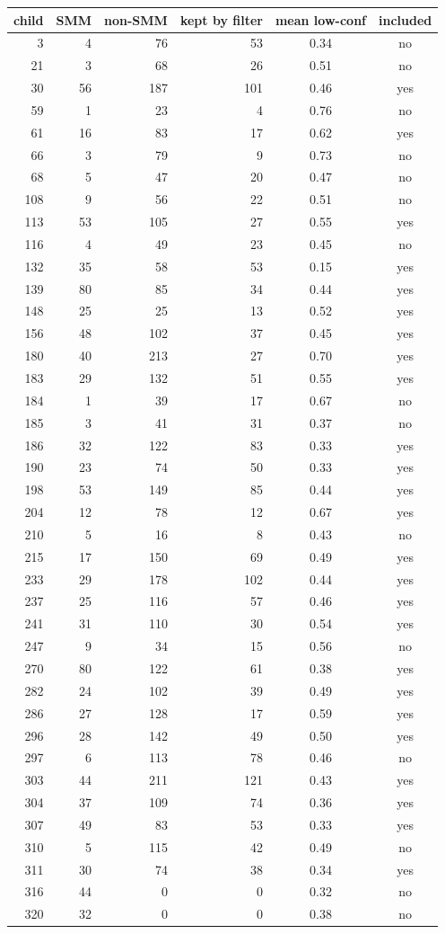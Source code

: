 \begin{tabular}{rrrrcc}
\toprule
child & SMM & non-SMM & kept by filter & mean low-conf & included \\
\midrule
3 & 4 & 76 & 53 & 0.34 & no \\
21 & 3 & 68 & 26 & 0.51 & no \\
30 & 56 & 187 & 101 & 0.46 & yes \\
59 & 1 & 23 & 4 & 0.76 & no \\
61 & 16 & 83 & 17 & 0.62 & yes \\
66 & 3 & 79 & 9 & 0.73 & no \\
68 & 5 & 47 & 20 & 0.47 & no \\
108 & 9 & 56 & 22 & 0.51 & no \\
113 & 53 & 105 & 27 & 0.55 & yes \\
116 & 4 & 49 & 23 & 0.45 & no \\
132 & 35 & 58 & 53 & 0.15 & yes \\
139 & 80 & 85 & 34 & 0.44 & yes \\
148 & 25 & 25 & 13 & 0.52 & yes \\
156 & 48 & 102 & 37 & 0.45 & yes \\
180 & 40 & 213 & 27 & 0.70 & yes \\
183 & 29 & 132 & 51 & 0.55 & yes \\
184 & 1 & 39 & 17 & 0.67 & no \\
185 & 3 & 41 & 31 & 0.37 & no \\
186 & 32 & 122 & 83 & 0.33 & yes \\
190 & 23 & 74 & 50 & 0.33 & yes \\
198 & 53 & 149 & 85 & 0.44 & yes \\
204 & 12 & 78 & 12 & 0.67 & yes \\
210 & 5 & 16 & 8 & 0.43 & no \\
215 & 17 & 150 & 69 & 0.49 & yes \\
233 & 29 & 178 & 102 & 0.44 & yes \\
237 & 25 & 116 & 57 & 0.46 & yes \\
241 & 31 & 110 & 30 & 0.54 & yes \\
247 & 9 & 34 & 15 & 0.56 & no \\
270 & 80 & 122 & 61 & 0.38 & yes \\
282 & 24 & 102 & 39 & 0.49 & yes \\
286 & 27 & 128 & 17 & 0.59 & yes \\
296 & 28 & 142 & 49 & 0.50 & yes \\
297 & 6 & 113 & 78 & 0.46 & no \\
303 & 44 & 211 & 121 & 0.43 & yes \\
304 & 37 & 109 & 74 & 0.36 & yes \\
307 & 49 & 83 & 53 & 0.33 & yes \\
310 & 5 & 115 & 42 & 0.49 & no \\
311 & 30 & 74 & 38 & 0.34 & yes \\
316 & 44 & 0 & 0 & 0.32 & no \\
320 & 32 & 0 & 0 & 0.38 & no \\
\bottomrule
\end{tabular}
